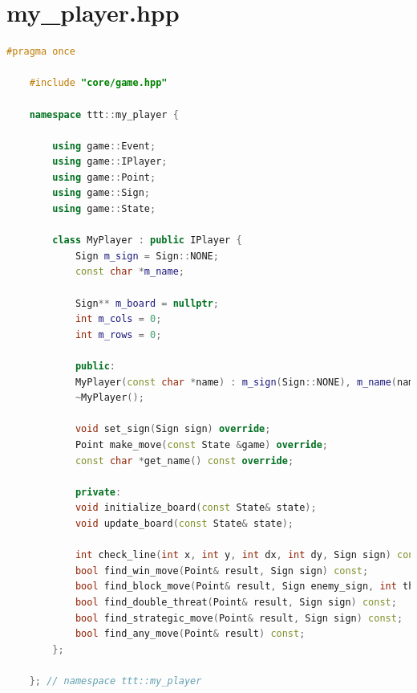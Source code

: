 \documentclass[a4paper]{article}
\begin{document}
\section{my\_player.hpp}
\begin{lstlisting}[language=C++]
	#pragma once
	
	#include "core/game.hpp"
	
	namespace ttt::my_player {
		
		using game::Event;
		using game::IPlayer;
		using game::Point;
		using game::Sign;
		using game::State;
		
		class MyPlayer : public IPlayer {
			Sign m_sign = Sign::NONE;
			const char *m_name;
			
			Sign** m_board = nullptr;
			int m_cols = 0;
			int m_rows = 0;
			
			public:
			MyPlayer(const char *name) : m_sign(Sign::NONE), m_name(name) {}
			~MyPlayer();
			
			void set_sign(Sign sign) override;
			Point make_move(const State &game) override;
			const char *get_name() const override;
			
			private:
			void initialize_board(const State& state);
			void update_board(const State& state);
			
			int check_line(int x, int y, int dx, int dy, Sign sign) const;
			bool find_win_move(Point& result, Sign sign) const;
			bool find_block_move(Point& result, Sign enemy_sign, int threat_level) const;
			bool find_double_threat(Point& result, Sign sign) const;
			bool find_strategic_move(Point& result, Sign sign) const;
			bool find_any_move(Point& result) const;
		};
		
	}; // namespace ttt::my_player
\end{lstlisting}
\end{document}
